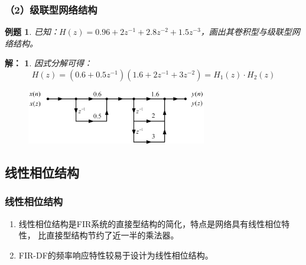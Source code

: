 \documentclass[notheorems,compress,mathserif,table]{beamer}
\newtheorem{example}{例题}
\newtheorem{answer}{解：}
\begin{document}
\begin{frame}[shrink]\frametitle{（2）级联型网络结构}%
\begin{example}
已知：$H(z) = 0.96+2z^{-1}+2.8z^{-2}+1.5z^{-3}$，画出其卷积型与级联型网络结构。
\end{example}
\begin{answer}
因式分解可得：
$$H(z) = (0.6+0.5z^{-1})(1.6+2z^{-1}+3z^{-2})=H_1(z)\cdot H_2(z)$$
\begin{figure}[h]
\centering
\includegraphics[width=0.7\textwidth]{lijilianxing.jpg}
\end{figure}
\end{answer}
\end{frame}
\subsection{线性相位结构}
\begin{frame}\frametitle{线性相位结构}%
\begin{enumerate}
  \item 线性相位结构是FIR系统的直接型结构的简化，特点是网络具有线性相位特性，
比直接型结构节约了近一半的乘法器。
  \item FIR-DF的频率响应特性较易于设计为线性相位结构。
\end{enumerate}



\end{frame}
\end{document}
